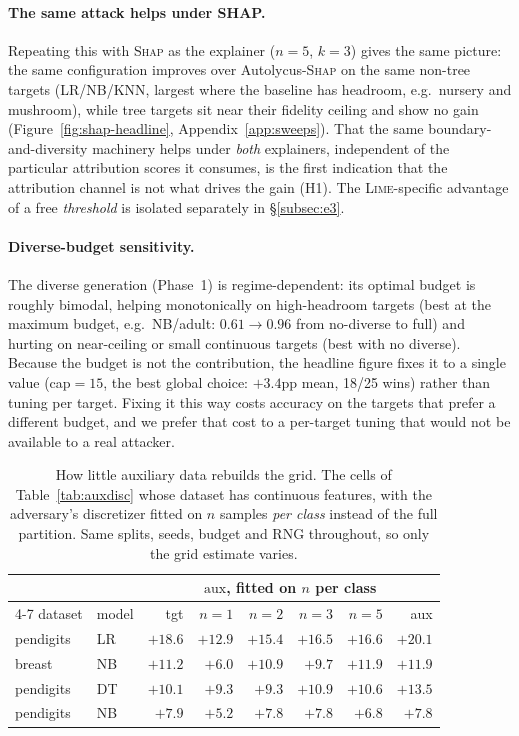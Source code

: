 \documentclass[sigconf,anonymous,review]{acmart}
\begin{document}
\paragraph{The same attack helps under SHAP.}
Repeating this with \textsc{Shap} as the explainer ($n{=}5$, $k{=}3$) gives the same picture: the
same configuration improves over Autolycus-\textsc{Shap} on the same non-tree targets (LR/NB/KNN,
largest where the baseline has headroom, e.g.\ nursery and mushroom), while tree targets sit near
their fidelity ceiling and show no gain (Figure~\ref{fig:shap-headline}, Appendix~\ref{app:sweeps}).
That the same boundary-and-diversity machinery helps under \emph{both} explainers, independent of the particular attribution scores it consumes, is the first indication that the attribution channel is
not what drives the gain (H1). The \textsc{Lime}-specific advantage of a free \emph{threshold} is
isolated separately in \S\ref{subsec:e3}.

\paragraph{Diverse-budget sensitivity.}
The diverse generation (Phase~1) is regime-dependent: its optimal budget is roughly bimodal,
helping monotonically on high-headroom targets (best at the maximum budget, e.g.\ NB/adult:
$0.61{\to}0.96$ from no-diverse to full) and hurting on near-ceiling or small continuous targets
(best with no diverse). Because the budget is not the contribution, the headline figure fixes it
to a single value (cap${=}15$, the best global choice: $+3.4$pp mean, 18/25 wins) rather than
tuning per target. Fixing it this way costs accuracy on the targets that prefer a different budget,
and we prefer that cost to a per-target tuning that would not be available to a real attacker.


\begin{table}[t]
\centering
\setlength{\tabcolsep}{4pt}
\caption{How little auxiliary data rebuilds the grid. The cells of Table~\ref{tab:auxdisc} whose
dataset has continuous features, with the adversary's discretizer fitted on $n$ samples \emph{per
class} instead of the full partition. Same splits, seeds, budget and RNG throughout, so only the
grid estimate varies.}
\label{tab:auxsize}
\begin{tabular}{llrrrrrr}
\toprule
 & & & \multicolumn{4}{c}{$\text{aux}$, fitted on $n$ per class} & \\
\cmidrule(lr){4-7}
dataset & model & tgt & $n{=}1$ & $n{=}2$ & $n{=}3$ & $n{=}5$ & aux \\
\midrule
pendigits & LR  & $+18.6$ & $+12.9$ & $+15.4$ & $+16.5$ & $+16.6$ & $+20.1$ \\
breast    & NB  & $+11.2$ & $+6.0$  & $+10.9$ & $+9.7$  & $+11.9$ & $+11.9$ \\
pendigits & DT  & $+10.1$ & $+9.3$  & $+9.3$  & $+10.9$ & $+10.6$ & $+13.5$ \\
pendigits & NB  & $+7.9$  & $+5.2$  & $+7.8$  & $+7.8$  & $+6.8$  & $+7.8$ \\
\bottomrule
\end{tabular}
\end{table}
\end{document}
